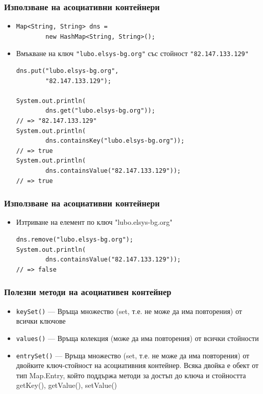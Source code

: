 \documentclass[ignorenonframetext, hyperref=unicode,compress]{beamer}
\begin{document}
\begin{frame}[containsverbatim]\frametitle{Използване на асоциативни контейнери}
\begin{itemize}
\item 
\begin{lstlisting}
Map<String, String> dns = 
		new HashMap<String, String>();
\end{lstlisting}
\item Вмъкване на ключ \lstinline{"lubo.elsys-bg.org"} със стойност \lstinline{"82.147.133.129"}
\begin{lstlisting}
dns.put("lubo.elsys-bg.org", 
		"82.147.133.129");

System.out.println(
		dns.get("lubo.elsys-bg.org"));
// => "82.147.133.129"
System.out.println(
		dns.containsKey("lubo.elsys-bg.org"));
// => true
System.out.println(
		dns.containsValue("82.147.133.129"));
// => true
\end{lstlisting}
\end{itemize}
\end{frame}

\begin{frame}[containsverbatim]\frametitle{Използване на асоциативни контейнери}
\begin{itemize}
\item Изтриване на елемент по ключ "lubo.elsys-bg.org"
\begin{lstlisting}
dns.remove("lubo.elsys-bg.org");
System.out.println(
		dns.containsValue("82.147.133.129"));
// => false
\end{lstlisting}
\end{itemize}
\end{frame}

\begin{frame}[containsverbatim]\frametitle{Полезни методи на асоциативен контейнер}
\begin{itemize}
\item \lstinline{keySet()} ---
Връща множество (set, т.е. не може да има повторения) от всички ключове
\item \lstinline{values()} ---
Връща колекция (може да има повторения) от всички стойности
\item \lstinline{entrySet()} ---
Връща множество (set, т.е. не може да има повторения) от двойките ключ-стойност на асоциативния контейнер.
Всяка двойка е обект от тип Map.Entry, който
поддържа методи за достъп до ключа и стойността getKey(), getValue(), setValue()
\end{itemize}
\end{frame}
\end{document}
